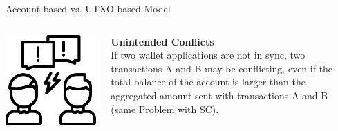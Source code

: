 \documentclass[handout]{beamer}
\begin{document}
\begin{frame}{Account-based vs. UTXO-based Model}
{\begin{columns}[T]
\begin{column}{0.25\textwidth}
			\includegraphics[scale=0.1]{../assets/images/argument.png}
		\end{column}
		\begin{column}{0.8\textwidth}
			\textbf{Unintended Conflicts}\\
If two wallet applications are not in sync, two transactions A and B may be conflicting, even if the total balance of the account is larger than the aggregated amount sent with transactions A and B (same Problem with SC).
		\end{column}
	\end{columns}
		}
\end{frame}
\end{document}
